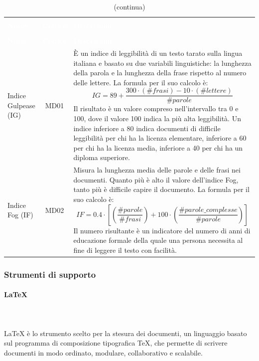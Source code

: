 \begin{longtable}{ C{4.5cm} c L{9.5cm} }
	\caption{Metriche di qualità dei documenti}\\
		\textcolor{white}{\textbf{Nome}} & \textcolor{white}{\textbf{Codice}} & \centerline{\textcolor{white}{\textbf{Descrizione}}} \\
		\endfirsthead
		\caption[]{(continua)} \\
		\textcolor{white}{\textbf{Nome}} & \textcolor{white}{\textbf{Codice}} & \centerline{\textcolor{white}{\textbf{Descrizione}}} \\
		\endhead
		Indice Gulpease (IG)  & MD01 & È un indice di leggibilità di un testo tarato sulla lingua italiana e basato su due variabili linguistiche: la lunghezza della parola e la lunghezza della frase rispetto al numero delle lettere. La formula per il suo calcolo è: \newline
\[ IG = 89 + \frac{300 \cdot (\#frasi) - 10 \cdot (\#lettere)}{\#parole} \] \newline
Il risultato è un valore compreso nell'intervallo tra 0 e 100, dove il valore 100 indica la più alta leggibilità. Un indice inferiore a 80 indica documenti di difficile leggibilità per chi ha la licenza elementare, inferiore a 60 per chi ha la licenza media, inferiore a 40 per chi ha un diploma superiore.
	\\	
	Indice Fog (IF) & MD02 & Misura la lunghezza media delle parole e delle frasi nei documenti. Quanto più è alto il valore dell'indice Fog, tanto più è difficile capire il documento. La formula per il suo calcolo è: \newline
	\[ IF = 0.4 \cdot [ (\frac{\#parole}{\#frasi}) + 100 \cdot (\frac{\#parole\_complesse}{\#parole})] \]
	Il numero risultante è un indicatore del numero di anni di educazione formale della quale una persona necessita al fine di leggere il testo con facilità. 
	\end{longtable}

\subsubsection{Strumenti di supporto}
\paragraph{\LaTeX{}}\mbox{} \\ \mbox{} \\
\LaTeX{} è lo strumento scelto per la stesura dei documenti, un linguaggio basato sul programma di composizione tipografica \TeX{}, che permette di scrivere documenti in modo ordinato, modulare, collaborativo e scalabile.

